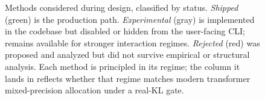 \begin{figure}[t]
\begin{tikzpicture}
\end{tikzpicture}
\caption{Methods considered during design, classified by status. \emph{Shipped}
(green) is the production path. \emph{Experimental} (gray) is implemented
in the codebase but disabled or hidden from the user-facing CLI; remains
available for stronger interaction regimes. \emph{Rejected} (red) was
proposed and analyzed but did not survive empirical or structural
analysis. Each method is principled in its regime; the column it lands in
reflects whether that regime matches modern transformer
mixed-precision allocation under a real-KL gate.}
\label{fig:methods_tree}
\end{figure}
